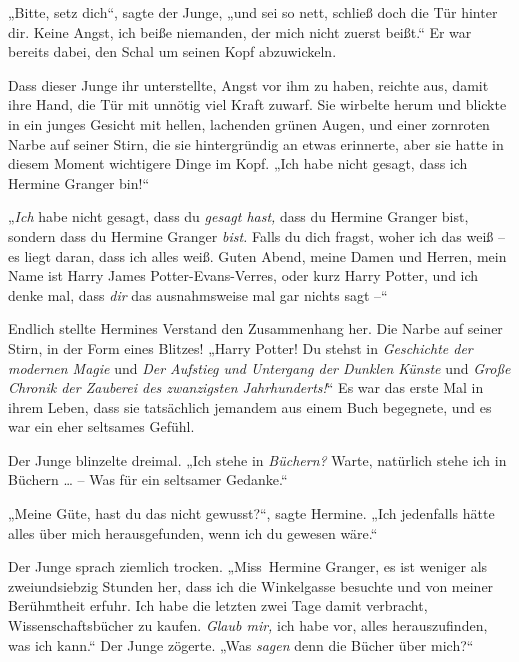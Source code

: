 {„Bitte, setz dich“, sagte der Junge, „und sei so nett, schließ doch die Tür hinter dir. Keine Angst, ich beiße niemanden, der mich nicht zuerst beißt.“ Er war bereits dabei, den Schal um seinen Kopf abzuwickeln.

Dass dieser Junge ihr unterstellte, Angst vor ihm zu haben, reichte aus, damit ihre Hand, die Tür mit unnötig viel Kraft zuwarf. Sie wirbelte herum und blickte in ein junges Gesicht mit hellen, lachenden grünen Augen, und einer zornroten Narbe auf seiner Stirn, die sie hintergründig an etwas erinnerte, aber sie hatte in diesem Moment wichtigere Dinge im Kopf. „Ich habe nicht gesagt, dass ich Hermine Granger bin!“

„\emph{Ich} habe nicht gesagt, dass du \emph{gesagt hast,} dass du Hermine Granger bist, sondern dass du Hermine Granger \emph{bist.} Falls du dich fragst, woher ich das weiß -- es liegt daran, dass ich alles weiß. Guten Abend, meine Damen und Herren, mein Name ist Harry James Potter-Evans-Verres, oder kurz Harry Potter, und ich denke mal, dass \emph{dir} das ausnahmsweise mal gar nichts sagt --“

Endlich stellte Hermines Verstand den Zusammenhang her. Die Narbe auf seiner Stirn, in der Form eines Blitzes! „Harry Potter! Du stehst in \emph{Geschichte der modernen Magie} und \emph{Der Aufstieg und Untergang der Dunklen Künste} und \emph{Große Chronik der Zauberei des zwanzigsten Jahrhunderts!}“ Es war das erste Mal in ihrem Leben, dass sie tatsächlich jemandem aus einem Buch begegnete, und es war ein eher seltsames Gefühl.

Der Junge blinzelte dreimal. „Ich stehe in \emph{Büchern?} Warte, natürlich stehe ich in Büchern … -- Was für ein seltsamer Gedanke.“

„Meine Güte, hast du das nicht gewusst?“, sagte Hermine. „Ich jedenfalls hätte alles über mich herausgefunden, wenn ich du gewesen wäre.“

Der Junge sprach ziemlich trocken. „Miss~Hermine Granger, es ist weniger als zweiundsiebzig Stunden her, dass ich die Winkelgasse besuchte und von meiner Berühmtheit erfuhr. Ich habe die letzten zwei Tage damit verbracht, Wissenschaftsbücher zu kaufen. \emph{Glaub mir,} ich habe vor, alles herauszufinden, was ich kann.“ Der Junge zögerte. „Was \emph{sagen} denn die Bücher über mich?“

}
